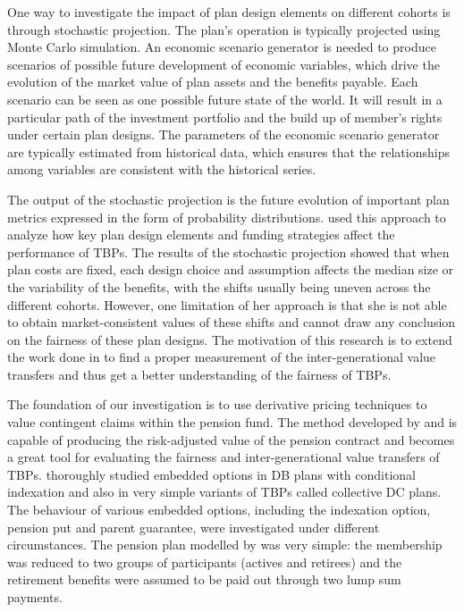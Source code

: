\documentclass{sfuthesis}
\numberwithin{equation}{chapter}
\begin{document}
	

		\justify
		One way to investigate the impact of plan design elements on different cohorts is through stochastic projection. The plan's operation is typically projected using Monte Carlo simulation. An economic scenario generator is needed to produce scenarios of possible future development of economic variables, which drive the evolution of the market value of plan assets and the benefits payable. Each scenario can be seen as one possible future state of the world. It will result in a particular path of the investment portfolio and the build up of member's rights under certain plan designs. The parameters of the economic scenario generator are typically estimated from historical data, which ensures that the relationships among variables are consistent with the historical series. 

	

		\justify
		The output of the stochastic projection is the future evolution of important plan metrics expressed in the form of probability distributions. \citet{Sanders2016a} used this approach to analyze how key plan design elements and funding strategies affect the performance of TBPs. The results of the stochastic projection showed that when plan costs are fixed, each design choice and assumption affects the median size or the variability of the benefits, with the shifts usually being uneven across the different cohorts. However, one limitation of her approach is that she is not able to obtain market-consistent values of these shifts and cannot draw any conclusion on the fairness of these plan designs. The motivation of this research is to extend the work done in \citet{Sanders2016a} to find a proper measurement of the inter-generational value transfers and thus get a better understanding of the fairness of TBPs.

	

		\justify
		The foundation of our investigation is to use derivative pricing techniques to value contingent claims within the pension fund. The method developed by \citet{Sharpe1976} and \citet{Sharpe1977} is capable of producing the risk-adjusted value of the pension contract and becomes a great tool for evaluating the fairness and inter-generational value transfers of TBPs. \citet{Kocken2006} thoroughly studied embedded options in DB plans with conditional indexation and also in very simple variants of TBPs called collective DC plans. The behaviour of various embedded options, including the indexation option, pension put and parent guarantee, were investigated under different circumstances. The pension plan modelled by \citet{Kocken2006} was very simple: the membership was reduced to two groups of participants (actives and retirees) and the retirement benefits were assumed to be paid out through two lump sum payments.
\end{document}
